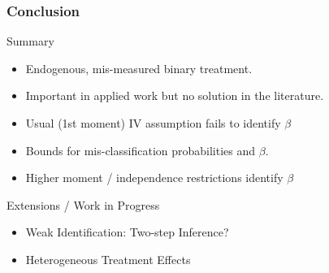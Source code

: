 \documentclass{beamer}
\begin{document}
\begin{frame}
  \frametitle{Conclusion}

  \begin{block}{Summary}
  \begin{itemize}
    \item Endogenous, mis-measured binary treatment.
    \item Important in applied work but no solution in the literature.
      \item Usual (1st moment) IV assumption fails to identify $\beta$
      \item Bounds for mis-classification probabilities and $\beta$.
      \item Higher moment / independence restrictions identify $\beta$
   \end{itemize}
  \end{block}

  \begin{block}{Extensions / Work in Progress}
    \begin{itemize}
      \item Weak Identification: Two-step Inference?
      \item Heterogeneous Treatment Effects 
    \end{itemize}
  \end{block}
\end{frame}
\appendix
\end{document}
